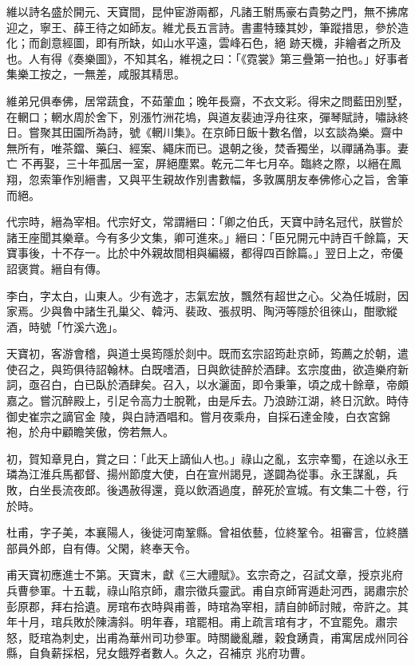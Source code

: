 \begin{pinyinscope}
 維以詩名盛於開元、天寶間，昆仲宦游兩都，凡諸王駙馬豪右貴勢之門，無不拂席迎之，寧王、薛王待之如師友。維尤長五言詩。書畫特臻其妙，筆蹤措思，參於造化；而創意經圖，即有所缺，如山水平遠，雲峰石色，絕
 跡天機，非繪者之所及也。人有得《奏樂圖》，不知其名，維視之曰：「《霓裳》第三疊第一拍也。」好事者集樂工按之，一無差，咸服其精思。



 維弟兄俱奉佛，居常蔬食，不茹葷血；晚年長齋，不衣文彩。得宋之問藍田別墅，在輞口；輞水周於舍下，別漲竹洲花塢，與道友裴迪浮舟往來，彈琴賦詩，嘯詠終日。嘗聚其田園所為詩，號《輞川集》。在京師日飯十數名僧，以玄談為樂。齋中無所有，唯茶鐺、藥臼、經案、繩床而已。退朝之後，焚香獨坐，以禪誦為事。妻亡
 不再娶，三十年孤居一室，屏絕塵累。乾元二年七月卒。臨終之際，以縉在鳳翔，忽索筆作別縉書，又與平生親故作別書數幅，多敦厲朋友奉佛修心之旨，舍筆而絕。



 代宗時，縉為宰相。代宗好文，常謂縉曰：「卿之伯氏，天寶中詩名冠代，朕嘗於諸王座聞其樂章。今有多少文集，卿可進來。」縉曰：「臣兄開元中詩百千餘篇，天寶事後，十不存一。比於中外親故間相與編綴，都得四百餘篇。」翌日上之，帝優詔褒賞。縉自有傳。



 李白，字太白，山東人。少有逸才，志氣宏放，飄然有超世之心。父為任城尉，因家焉。少與魯中諸生孔巢父、韓沔、裴政、張叔明、陶沔等隱於徂徠山，酣歌縱酒，時號「竹溪六逸」。



 天寶初，客游會稽，與道士吳筠隱於剡中。既而玄宗詔筠赴京師，筠薦之於朝，遣使召之，與筠俱待詔翰林。白既嗜酒，日與飲徒醉於酒肆。玄宗度曲，欲造樂府新詞，亟召白，白已臥於酒肆矣。召入，以水灑面，即令秉筆，頃之成十餘章，帝頗嘉之。嘗沉醉殿上，引足令高力士脫靴，由是斥去。乃浪跡江湖，終日沉飲。時侍御史崔宗之謫官金
 陵，與白詩酒唱和。嘗月夜乘舟，自採石達金陵，白衣宮錦袍，於舟中顧瞻笑傲，傍若無人。



 初，賀知章見白，賞之曰：「此天上謫仙人也。」祿山之亂，玄宗幸蜀，在途以永王璘為江淮兵馬都督、揚州節度大使，白在宣州謁見，遂闢為從事。永王謀亂，兵敗，白坐長流夜郎。後遇赦得還，竟以飲酒過度，醉死於宣城。有文集二十卷，行於時。



 杜甫，字子美，本襄陽人，後徙河南鞏縣。曾祖依藝，位終鞏令。祖審言，位終膳部員外郎，自有傳。父閑，終奉天令。



 甫天寶初應進士不第。天寶末，獻《三大禮賦》。玄宗奇之，召試文章，授京兆府兵曹參軍。十五載，祿山陷京師，肅宗徵兵靈武。甫自京師宵遁赴河西，謁肅宗於彭原郡，拜右拾遺。房琯布衣時與甫善，時琯為宰相，請自帥師討賊，帝許之。其年十月，琯兵敗於陳濤斜。明年春，琯罷相。甫上疏言琯有才，不宜罷免。肅宗怒，貶琯為刺史，出甫為華州司功參軍。時關畿亂離，穀食踴貴，甫寓居成州同谷縣，自負薪採梠，兒女餓殍者數人。久之，召補京
 兆府功曹。




\end{pinyinscope}
